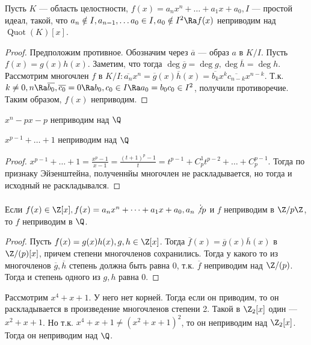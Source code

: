 \begin{proposition}
    Пусть \(K\) --- область целостности, \(f(x) = a_nx^n + \dots + a_1x + a_0, I\) --- простой идеал, такой, что \(a_n \notin I, a_{n - 1}, \dots a_0 \in I, a_0 \notin I^2 \Ra f(x)\) неприводим над \(\operatorname{Quot}(K)[x]\).
\end{proposition}
\begin{proof}
    Предположим противное. Обозначим через \(\overline{a}\) --- образ \(a\) в \(K/I\). Пусть \(f(x) = g(x)h(x)\). Заметим, что тогда \(\deg \overline{g} = \deg g, \deg \overline{h} = \deg h\). Рассмотрим многочлен \(f\) в \(K/I: \overline{a_n}x^n = \overline{g}(x)\overline{h}(x)= \overline{b_k}x^k\overline{c_{n - k}}x^{n - k}\). Т.к. \(k \ne 0, n \Ra \overline{b_0}, \overline{c_0} = 0 \Ra b_0, c_0 \in I \Ra a_0 = b_0c_0 \in I^2\), получили противоречие. Таким образом, \(f(x)\) неприводим.
\end{proof}

\begin{example}
    \(x^n - px - p\) неприводим над \(\Q\)
\end{example}
\begin{example}
    \(x^{p - 1} + \dots + 1\) неприводим над \(\Q\)
\end{example}
\begin{proof}
    \(x^{p - 1} + \dots + 1 = \frac{x^p - 1}{x - 1} = \frac{(t + 1)^p - 1}{t} = t^{p - 1} + C_p^1t^{p - 2} + \dots + C_p^{p - 1}\). Тогда по признаку Эйзенштейна, полученнйы многочлен не раскладывается, но тогда и исходный не раскладывался.
\end{proof}

\begin{proposition}
    Если \(f(x) \in \Z[x], f(x) = a_nx^n + \dots + a_1x + a_0, a_n \not\vdots p\) и \(f\) неприводим в \(\Z/p\Z\), то \(f\) неприводим в \(\Q\).
\end{proposition}
\begin{proof}
    Пусть \(f(x) = g(x)h(x), g, h \in \Z[x]\). Тогда \(\overline{f}(x) = \overline{g}(x)\overline{h}(x)\) в \(\Z/(p)[x]\), причем степени многочленов сохранились. Тогда у какого то из многочленов \(\overline{g}, \overline{h}\) степень должна быть равна 0, т.к. \(\overline{f}\) неприводим над \(\Z/(p)\). Тогда и степень одного из \(g, h\) равна 0.
\end{proof}

\begin{example}
    Рассмотрим \(x^4 + x + 1\). У него нет корней. Тогда если он приводим, то он раскладывается в произведение многочленов степени 2. Такой в \(\Z_2[x]\) один --- \(x^2 + x + 1\). Но т.к. \(x^4 + x + 1 \ne (x^2 + x + 1)^2\), то он неприводим над \(\Z_2[x]\). Тогда он неприводим над \(\Q\).
\end{example}

